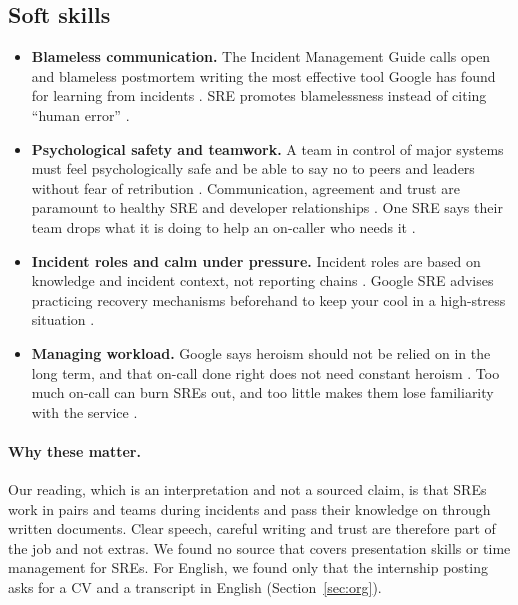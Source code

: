 \subsection{Soft skills}
\begin{itemize}
  \item \textbf{Blameless communication.} The Incident Management Guide calls open and blameless postmortem writing the most effective tool Google has found for learning from incidents \cite{static-pdf-incidentmanagementguide-pdf}. SRE promotes blamelessness instead of citing ``human error'' \cite{static-pdf-enterprise-roadmap-to-sre-pdf}.
  \item \textbf{Psychological safety and teamwork.} A team in control of major systems must feel psychologically safe and be able to say no to peers and leaders without fear of retribution \cite{static-pdf-enterprise-roadmap-to-sre-pdf}. Communication, agreement and trust are paramount to healthy SRE and developer relationships \cite{static-pdf-trainingsitereliabilityengineers-pdf}. One SRE says their team drops what it is doing to help an on-caller who needs it \cite{prodcast-transcripts-sre-prodcast-03-06}.
  \item \textbf{Incident roles and calm under pressure.} Incident roles are based on knowledge and incident context, not reporting chains \cite{static-pdf-incidentmanagementguide-pdf}. Google SRE advises practicing recovery mechanisms beforehand to keep your cool in a high-stress situation \cite{sre-articles}.
  \item \textbf{Managing workload.} Google says heroism should not be relied on in the long term, and that on-call done right does not need constant heroism \cite{sre-articles}. Too much on-call can burn SREs out, and too little makes them lose familiarity with the service \cite{static-pdf-trainingsitereliabilityengineers-pdf}.
\end{itemize}

\paragraph{Why these matter.}
Our reading, which is an interpretation and not a sourced claim, is that SREs work in pairs and teams during incidents and pass their knowledge on through written documents. Clear speech, careful writing and trust are therefore part of the job and not extras. We found no source that covers presentation skills or time management for SREs. For English, we found only that the internship posting asks for a CV and a transcript in English (Section~\ref{sec:org}).
